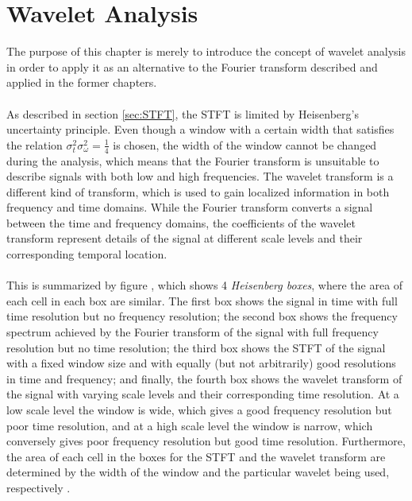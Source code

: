 \chapter{Wavelet Analysis} \label{ch12}
The purpose of this chapter is merely to introduce the concept of wavelet analysis in order to apply it as an alternative to the Fourier transform described and applied in the former chapters.
\\ \\
As described in section \ref{sec:STFT}, the STFT is limited by Heisenberg's uncertainty principle. Even though a window with a certain width that satisfies the relation $\sigma_t^2 \sigma_\omega^2 = \frac{1}{4}$ is chosen, the width of the window cannot be changed during the analysis, which means that the Fourier transform is unsuitable to describe signals with both low and high frequencies. The wavelet transform is a different kind of transform, which is used to gain localized information in both frequency and time domains. While the Fourier transform converts a signal between the time and frequency domains, the coefficients of the wavelet transform represent details of the signal at different scale levels and their corresponding temporal location.
\\ \\
This is summarized by figure , which shows 4 \textit{Heisenberg boxes}, where the area of each cell in each box are similar. The first box shows the signal in time with full time resolution but no frequency resolution; the second box shows the frequency spectrum achieved by the Fourier transform of the signal with full frequency resolution but no time resolution; the third box shows the STFT of the signal with a fixed window size and with equally (but not arbitrarily) good resolutions in time and frequency; and finally, the fourth box shows the wavelet transform of the signal with varying scale levels and their corresponding time resolution. At a low scale level the window is wide, which gives a good frequency resolution but poor time resolution, and at a high scale level the window is narrow, which conversely gives poor frequency resolution but good time resolution. Furthermore, the area of each cell in the boxes for the STFT and the wavelet transform are determined by the width of the window and the particular wavelet being used, respectively \cite{pages 409-410, Wang} \cite{page 43-44, wave_tut}.

